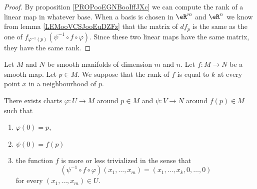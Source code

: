 \begin{proof}
    By proposition \ref{PROPooEGNBooIffJXc} we can compute the rank of a linear map in whatever base. When a basis is chosen in \( \eR^m\) and \( \eR^n\) we know from lemma \ref{LEMooVCSJooEuDZFz} that the matrix of \( df_p\) is the same as the one of \(  f_{\varphi^{-1}(p)}(\psi^{-1}\circ f\circ \varphi) \). Since these two linear maps have the same matrix, they have the same rank.
\end{proof}

\begin{theorem}       \label{THOooSWKVooTJQsXc}
    Let \( M\) and \( N\) be smooth manifolds of dimension \( m\) and \( n\). Let \( f\colon M\to N\) be a smooth map. Let \( p\in M\). We suppose that the rank of \( f\) is equal to \( k\) at every point \( x\) in a neighbourhood of \( p\). 

    There exists charts \( \varphi\colon U\to M\) around \( p\in M\) and \( \psi\colon V\to N\) around \( f(p)\in M\) such that 
    \begin{enumerate}
        \item
            \( \varphi(0)=p\),
        \item
            \( \psi(0)=f(p)\)
        \item
            the function \( f\) is more or less trivialized in the sense that
            \begin{equation}
                (\psi^{-1}\circ f\circ\varphi)(x_1,\ldots, x_m)=(x_1,\ldots, x_k,0,\ldots, 0)
            \end{equation}
            for every \( (x_1,\ldots, x_m)\in U\).
    \end{enumerate}
\end{theorem}

